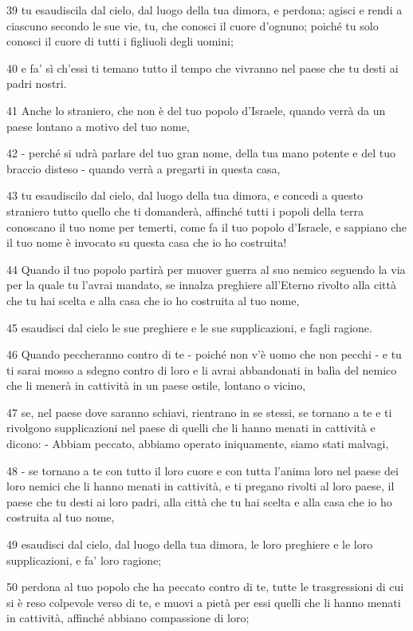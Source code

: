 \par 39 tu esaudiscila dal cielo, dal luogo della tua dimora, e perdona; agisci e rendi a ciascuno secondo le sue vie, tu, che conosci il cuore d'ognuno; poiché tu solo conosci il cuore di tutti i figliuoli degli uomini;
\par 40 e fa' sì ch'essi ti temano tutto il tempo che vivranno nel paese che tu desti ai padri nostri.
\par 41 Anche lo straniero, che non è del tuo popolo d'Israele, quando verrà da un paese lontano a motivo del tuo nome,
\par 42 - perché si udrà parlare del tuo gran nome, della tua mano potente e del tuo braccio disteso - quando verrà a pregarti in questa casa,
\par 43 tu esaudiscilo dal cielo, dal luogo della tua dimora, e concedi a questo straniero tutto quello che ti domanderà, affinché tutti i popoli della terra conoscano il tuo nome per temerti, come fa il tuo popolo d'Israele, e sappiano che il tuo nome è invocato su questa casa che io ho costruita!
\par 44 Quando il tuo popolo partirà per muover guerra al suo nemico seguendo la via per la quale tu l'avrai mandato, se innalza preghiere all'Eterno rivolto alla città che tu hai scelta e alla casa che io ho costruita al tuo nome,
\par 45 esaudisci dal cielo le sue preghiere e le sue supplicazioni, e fagli ragione.
\par 46 Quando peccheranno contro di te - poiché non v'è uomo che non pecchi - e tu ti sarai mosso a sdegno contro di loro e li avrai abbandonati in balìa del nemico che li menerà in cattività in un paese ostile, lontano o vicino,
\par 47 se, nel paese dove saranno schiavi, rientrano in se stessi, se tornano a te e ti rivolgono supplicazioni nel paese di quelli che li hanno menati in cattività e dicono: - Abbiam peccato, abbiamo operato iniquamente, siamo stati malvagi,
\par 48 - se tornano a te con tutto il loro cuore e con tutta l'anima loro nel paese dei loro nemici che li hanno menati in cattività, e ti pregano rivolti al loro paese, il paese che tu desti ai loro padri, alla città che tu hai scelta e alla casa che io ho costruita al tuo nome,
\par 49 esaudisci dal cielo, dal luogo della tua dimora, le loro preghiere e le loro supplicazioni, e fa' loro ragione;
\par 50 perdona al tuo popolo che ha peccato contro di te, tutte le trasgressioni di cui si è reso colpevole verso di te, e muovi a pietà per essi quelli che li hanno menati in cattività, affinché abbiano compassione di loro;
